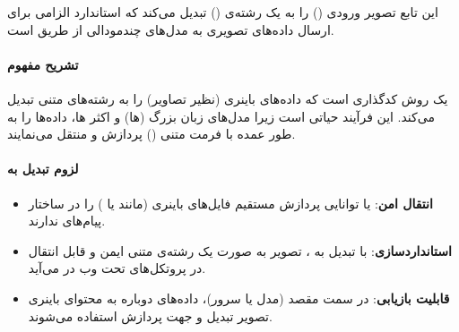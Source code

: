 \documentclass{article}
\begin{document}
این تابع تصویر ورودی () را به یک رشته‌ی  () تبدیل می‌کند که استاندارد الزامی برای ارسال داده‌های تصویری به مدل‌های چندمودالی از طریق  است.

\paragraph{تشریح مفهوم }
 یک روش کدگذاری است که داده‌های باینری (نظیر تصاویر) را به رشته‌های متنی  تبدیل می‌کند. این فرآیند حیاتی است زیرا مدل‌های زبان بزرگ (ها) و اکثر ها، داده‌ها را به طور عمده با فرمت متنی () پردازش و منتقل می‌نمایند. 

\paragraph{لزوم تبدیل به }
\begin{itemize}
    \item \textbf{انتقال امن}:  یا  توانایی پردازش مستقیم فایل‌های باینری (مانند  یا ) را در ساختار پیام‌های  ندارند.
    \item \textbf{استانداردسازی}: با تبدیل به ، تصویر به صورت یک رشته‌ی متنی ایمن و قابل انتقال در پروتکل‌های تحت وب در می‌آید.
    \item \textbf{قابلیت بازیابی}: در سمت مقصد (مدل یا سرور)، داده‌های  دوباره به محتوای باینری تصویر تبدیل و جهت پردازش استفاده می‌شوند.
\end{itemize}
\end{document}
